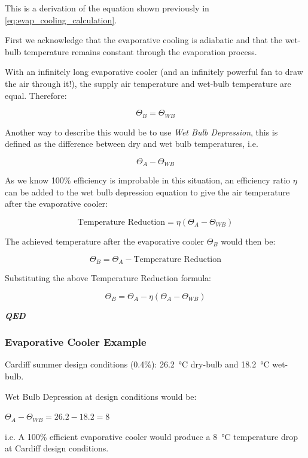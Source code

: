 \begin{derivation}
\label{der:EvapEfficiency}
\onehalfspacing

This is a derivation of the equation shown previously in \autoref{eq:evap_cooling_calculation}.

First we acknowledge that the evaporative cooling is adiabatic and that the wet-bulb temperature remains constant through the evaporation process.

With an infinitely long evaporative cooler (and an infinitely powerful fan to draw the air through it!), the supply air temperature and wet-bulb temperature are equal. Therefore:

\[\Theta_{B} = \Theta_{WB}\]

Another way to describe this would be to use \textit{Wet Bulb Depression}, this is defined as the difference between dry and wet bulb temperatures, i.e.

\[\Theta_{A} - \Theta_{WB}\]

As we know 100\% efficiency is improbable in this situation, an efficiency ratio $\eta$ can be added to the wet bulb depression equation to give the air temperature after the evaporative cooler:

\[\text{Temperature Reduction} = \eta (\Theta_{A} - \Theta_{WB})\]

The achieved temperature after the evaporative cooler $\Theta_{B}$ would then be:

\[\Theta_{B} = \Theta_{A} - \text{Temperature Reduction}\]

Substituting the above Temperature Reduction formula:

\[\Theta_{B} = \Theta_{A} - \eta(\Theta_{A} - \Theta_{WB})\]

\textbf{\textit{QED}}
\end{derivation}

\subsubsection{Evaporative Cooler Example}
\label{ssec:EvapCalExample}

Cardiff summer design conditions (0.4\%): \SI{26.2}{\celsius} dry-bulb and \SI{18.2}{\celsius} wet-bulb.

Wet Bulb Depression at design conditions would be:

$\Theta_{A} - \Theta_{WB} = 26.2 - 18.2 = 8$

i.e. A 100\% efficient evaporative cooler would produce a \SI{8}{\celsius} temperature drop at Cardiff design conditions.

